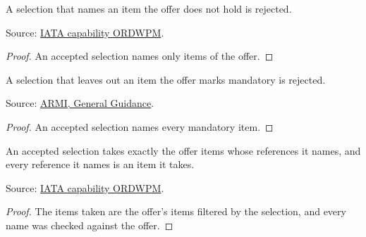 \begin{theorem}
  \label{thm:order-creation-select-unknown}
  A selection that names an item the offer does not hold is rejected.

  Source: \href{https://retailing.iata.org/armi/docs/ORDWPM/}{IATA capability ORDWPM}.
\end{theorem}
\begin{proof}
  An accepted selection names only items of the offer.
\end{proof}

\begin{theorem}
  \label{thm:order-creation-select-mandatory}
  A selection that leaves out an item the offer marks mandatory is rejected.

  Source: \href{https://standards.atlassian.net/wiki/spaces/ARMI/pages/584318980/General+Guidance}{ARMI, General Guidance}.
\end{theorem}
\begin{proof}
  An accepted selection names every mandatory item.
\end{proof}

\begin{theorem}
  \label{thm:order-creation-select-named}
  An accepted selection takes exactly the offer items whose references it
  names, and every reference it names is an item it takes.

  Source: \href{https://retailing.iata.org/armi/docs/ORDWPM/}{IATA capability ORDWPM}.
\end{theorem}
\begin{proof}
  The items taken are the offer's items filtered by the selection, and every
  name was checked against the offer.
\end{proof}

